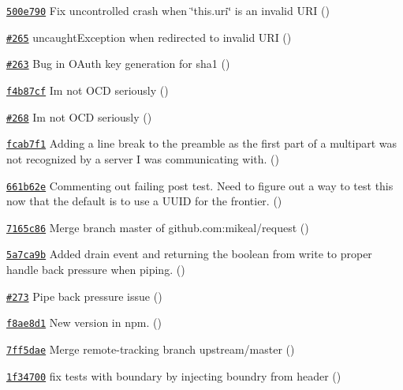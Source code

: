 \begin{DoxyItemize}
\item \href{https://github.com/mikeal/request/commit/500e790f8773f245ff43dd9c14ec3d5c92fe0b9e}{\tt 500e790} Fix uncontrolled crash when \char`\"{}this.\+uri\char`\"{} is an invalid U\+R\+I ()
\item \href{https://github.com/mikeal/request/pull/265}{\tt \#265} uncaught\+Exception when redirected to invalid U\+R\+I ()
\item \href{https://github.com/mikeal/request/pull/263}{\tt \#263} Bug in O\+Auth key generation for sha1 ()
\item \href{https://github.com/mikeal/request/commit/f4b87cf439453b3ca1d63e85b3aeb3373ee1f17e}{\tt f4b87cf} I\textquotesingle{}m not O\+C\+D seriously ()
\item \href{https://github.com/mikeal/request/pull/268}{\tt \#268} I\textquotesingle{}m not O\+C\+D seriously ()
\item \href{https://github.com/mikeal/request/commit/fcab7f1953cd6fb141a7d98f60580c50b59fb73f}{\tt fcab7f1} Adding a line break to the preamble as the first part of a multipart was not recognized by a server I was communicating with. ()
\item \href{https://github.com/mikeal/request/commit/661b62e5319bf0143312404f1fc81c895c46f6e6}{\tt 661b62e} Commenting out failing post test. Need to figure out a way to test this now that the default is to use a U\+U\+I\+D for the frontier. ()
\item \href{https://github.com/mikeal/request/commit/7165c867fa5dea4dcb0aab74d2bf8ab5541e3f1b}{\tt 7165c86} Merge branch \textquotesingle{}master\textquotesingle{} of github.\+com\+:mikeal/request ()
\item \href{https://github.com/mikeal/request/commit/5a7ca9b398c1300c08a28fb7f266054c3ce8c57a}{\tt 5a7ca9b} Added drain event and returning the boolean from write to proper handle back pressure when piping. ()
\item \href{https://github.com/mikeal/request/pull/273}{\tt \#273} Pipe back pressure issue ()
\item \href{https://github.com/mikeal/request/commit/f8ae8d18627e4743996d8600f77f4e4c05a2a590}{\tt f8ae8d1} New version in npm. ()
\item \href{https://github.com/mikeal/request/commit/7ff5daef152bcfac5b02e661e5476a57b9693489}{\tt 7ff5dae} Merge remote-\/tracking branch \textquotesingle{}upstream/master\textquotesingle{} ()
\item \href{https://github.com/mikeal/request/commit/1f34700e5614ea2a2d78b80dd467c002c3e91cb3}{\tt 1f34700} fix tests with boundary by injecting boundry from header ()

\end{DoxyItemize}
